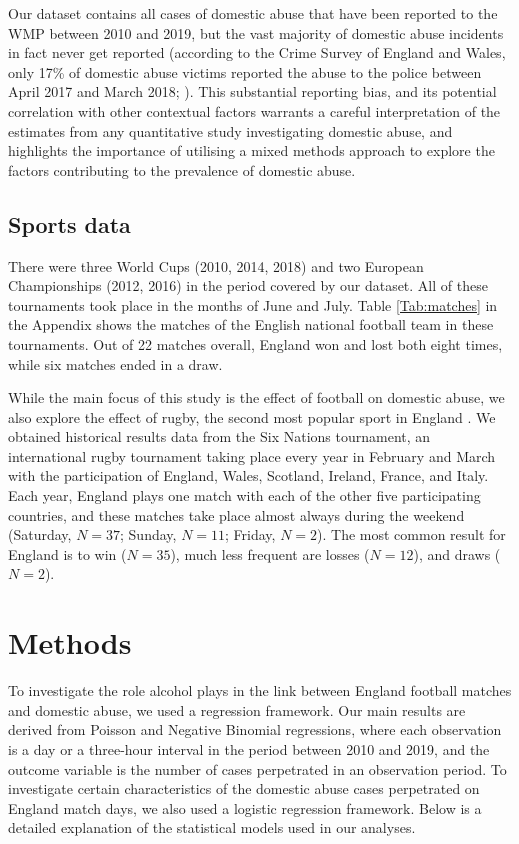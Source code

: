 \documentclass[12pt, a4paper]{article}
\begin{document}
Our dataset contains all cases of domestic abuse that have been reported to the WMP between 2010 and 2019, but the vast majority of domestic abuse incidents in fact never get reported (according to the Crime Survey of England and Wales, only 17\% of domestic abuse victims reported the abuse to the police between April 2017 and March 2018; ). This substantial reporting bias, and its potential correlation with other contextual factors warrants a careful interpretation of the estimates from any quantitative study investigating domestic abuse, and highlights the importance of utilising a mixed methods approach to explore the factors contributing to the prevalence of domestic abuse.

 \subsection{Sports data}


 There were three World Cups (2010, 2014, 2018) and two European Championships (2012, 2016) in the period covered by our dataset. All of these tournaments took place in the months of June and July. Table \ref{Tab:matches} in the Appendix shows the matches of the English national football team in these tournaments. Out of 22 matches overall, England won and lost both eight times, while six matches ended in a draw.

While the main focus of this study is the effect of football on domestic abuse, we also explore the effect of rugby, the second most popular sport in England \cite{Ipsos2003}. We obtained historical results data from the Six Nations tournament, an international rugby tournament taking place every year in February and March with the participation of England, Wales, Scotland, Ireland, France, and Italy. Each year, England plays one match with each of the other five participating countries, and these matches take place almost always during the weekend (Saturday, $N = 37$; Sunday, $N = 11$; Friday, $N = 2$). The most common result for England is to win ($N = 35$), much less frequent are losses ($N = 12$), and draws ($N = 2$).

\section{Methods}


To investigate the role alcohol plays in the link between England football matches and domestic abuse, we used a regression framework. Our main results are derived from Poisson and Negative Binomial regressions, where each observation is a day or a three-hour interval in the period between 2010 and 2019, and the outcome variable is the number of cases perpetrated in an observation period. To investigate certain characteristics of the domestic abuse cases perpetrated on England match days, we also used a logistic regression framework. Below is a detailed explanation of the statistical models used in our analyses.
\end{document}
